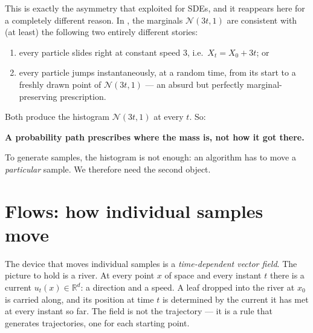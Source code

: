 \documentclass[11pt,a4paper]{report}
\theoremstyle{definition}
\theoremstyle{remark}
\newcommand{\RR}{\mathbb R}
\begin{document}
This is exactly the asymmetry that 
exploited for SDEs, and it reappears here for a completely different
reason. In , the marginals $\mathcal N(3t,1)$ are
consistent with (at least) the following two entirely different stories:

\begin{enumerate}
\item every particle slides right at constant speed $3$, i.e.\
      $X_t = X_0 + 3t$; or
\item every particle jumps instantaneously, at a random time, from its
      start to a freshly drawn point of $\mathcal N(3t,1)$ --- an
      absurd but perfectly marginal-preserving prescription.
\end{enumerate}

Both produce the histogram $\mathcal N(3t,1)$ at every $t$. So:

\begin{center}
\textbf{A probability path prescribes where the mass is, not how it got
there.}
\end{center}

To generate samples, the histogram is not enough: an algorithm has to move
a \emph{particular} sample. We therefore need the second object.

\section{Flows: how individual samples move}
\label{sec:cnf}

The device that moves individual samples is a \emph{time-dependent vector
field}. The picture to hold is a river. At every point $x$ of space and
every instant $t$ there is a current $u_t(x)\in\RR^d$: a direction and a
speed. A leaf dropped into the river at $x_0$ is carried along, and its
position at time $t$ is determined by the current it has met at every
instant so far. The field is not the trajectory --- it is a rule that
generates trajectories, one for each starting point.
\end{document}
